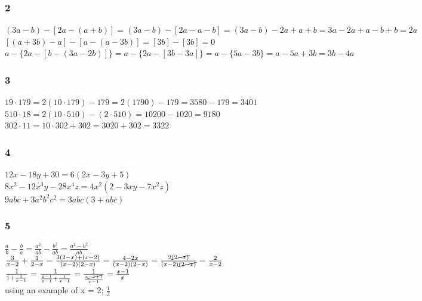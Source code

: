 \documentclass[]{report}
\begin{document}
\subsubsection{2}
$ (3a - b)  - [2a - (a + b)] = (3a - b) - [2a - a - b] = (3a - b) - 2a + a + b = 3a - 2a + a - b + b = 2a $ \\


$ [(a + 3b) -a] - [a - (a - 3b)] =  [3b] -  [3b] = 0 $ \\



$ a - \{2a - [b - (3a - 2b)]\} = a  - \{2a - [3b - 3a]\} = a  - \{5a - 3b\} = a - 5a + 3b = 3b - 4a $

\subsubsection{3}
$ 19 \cdot 179 = 2(10 \cdot 179) - 179 = 2(1790) - 179 = 3580 - 179 = 3401 $ \\
$ 510 \cdot 18 = 2(10 \cdot 510) - (2 \cdot 510) = 10200 - 1020 = 9180 $ \\
$ 302 \cdot 11 = 10\cdot 302 + 302 = 3020 + 302 = 3322 $ \\

\subsubsection{4}

$ 12x - 18y + 30 = 6(2x - 3y + 5)$ \\
$ 8x^2 - 12x^3y - 28x^4z = 4x^2(2 - 3xy -7x^2z)$ \\
$ 9abc + 3a^2b^2c^2 = 3abc(3 + abc) $

\subsubsection{5}

$ \frac{a}{b} - \frac{b}{a} = \frac{a^2}{ab} - \frac{b^2}{ab} = \frac{a^2-b^2}{ab} $\\
$\frac{3}{x - 2}  + \frac{1}{2-x} = \frac{3(2-x) + (x-2)}{(x-2)(2-x)} = \frac{4 - 2x}{(x-2)(2-x)} =\frac{2\cancel{(2 - x)}}{(x-2)\cancel{(2-x)}} = \frac{2}{x-2}$\\


$\frac{1}{1 + \frac{1}{x-1}} = \frac{1}{\frac{x-1}{x-1} + \frac{1}{x-1}} = \frac{1}{\frac{x\cancel{-1+1}}{x-1}} = \frac{x-1}{x}$ \\

using an example of x = 2;
$\frac{1}{2} $ 
\end{document}
